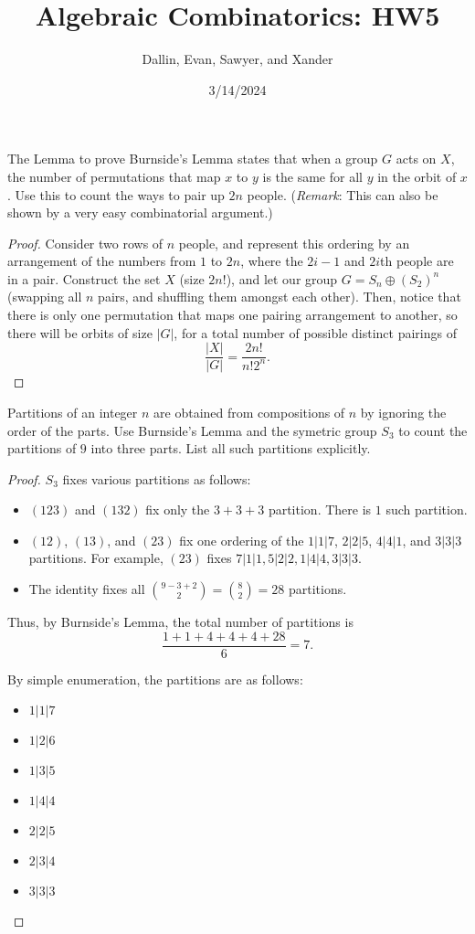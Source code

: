 \documentclass[11pt]{article}
\title{Algebraic Combinatorics: HW5}
\author{Dallin, Evan, Sawyer, and Xander}
\date{3/14/2024}
\begin{document}
\maketitle
\begin{quest}[\textcolor{red}{Pairing $2n$ people}]
    The Lemma to prove Burnside’s Lemma states that when a group $G$ acts on $X$, the number of permutations that map $x$ to $y$ is the same for all $y$ in the orbit of $x$. Use this to count the ways to pair up $2n$ people. (\textit{Remark}: This can also be shown by a very easy combinatorial argument.)
\end{quest}
\begin{proof}
    Consider two rows of $n$ people, and represent this ordering by an arrangement of the numbers from $1$ to $2n$, where the $2i-1$ and $2i$th people are in a pair. Construct the set $X$ (size $2n!$), and let our group $G=S_n\oplus (S_2)^n$ (swapping all $n$ pairs, and shuffling them amongst each other). Then, notice that there is only one permutation that maps one pairing arrangement to another, so there will be orbits of size $|G|$, for a total number of possible distinct pairings of \[\frac{|X|}{|G|}=\frac{2n!}{n!2^n}.\]
\end{proof}
\begin{quest}
    Partitions of an integer $n$ are obtained from compositions of $n$ by ignoring the order of the parts. Use Burnside's Lemma and the symetric group $S_3$ to count the partitions of $9$ into three parts. List all such partitions explicitly.
\end{quest}
\begin{proof}
    $S_3$ fixes various partitions as follows:
    \begin{itemize}
        \item $(123)$ and $(132)$ fix only the $3+3+3$ partition. There is $1$ such partition.
        \item $(12)$, $(13)$, and $(23)$ fix one ordering of the $1|1|7$, $2|2|5$, $4|4|1$, and $3|3|3$ partitions. For example, $(23)$ fixes $7|1|1,5|2|2,1|4|4,3|3|3$.
        \item The identity fixes all $\binom{9-3+2}{2}=\binom{8}{2}=28$ partitions.
    \end{itemize}
    Thus, by Burnside's Lemma, the total number of partitions is
    \[\frac{1+1+4+4+4+28}{6}=\boxed{7}.\]

    By simple enumeration, the partitions are as follows:
    \begin{itemize}
        \item $1|1|7$
        \item $1|2|6$
        \item $1|3|5$
        \item $1|4|4$
        \item $2|2|5$
        \item $2|3|4$
        \item $3|3|3$
    \end{itemize}
\end{proof}
\end{document}
